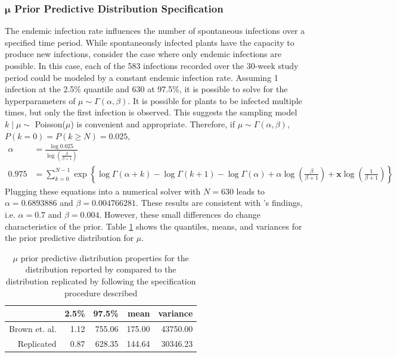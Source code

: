 \documentclass{uwstat572}
\begin{document}
\subsubsection{$\boldsymbol{\mu}$ Prior Predictive Distribution Specification}
The endemic infection rate influences the number of spontaneous infections over a specified time period. 
While spontaneously infected plants have the capacity to produce new infections, consider the case where only endemic infections are possible.
In this case, each of the 583 infections recorded over the 30-week study period could be modeled by a constant endemic infection rate. 
Assuming 1 infection at the 2.5\% quantile and 630 at 97.5\%, it is possible to solve for the hyperparameters of $\mu \sim \Gamma(\alpha, \beta)$. 
It is possible for plants to be infected multiple times, but only the first infection is observed. 
This suggests the sampling model $k \mid \mu \sim$ Poisson($\mu$) is convenient and appropriate. 
Therefore, if $\mu \sim \Gamma(\alpha, \beta)$, $P(k=0)=P(k \ge N)=0.025$,
\begin{align*}
\alpha &= \frac{\log 0.025}{\log \left( \frac{\beta}{\beta+1} \right)} \\
0.975 &= \sum_{k=0}^{N-1} \exp \left\{ \log \Gamma(\alpha+k) - \log \Gamma(k+1) - \log \Gamma(\alpha) + \alpha \log \left(\frac{\beta}{\beta +1} \right) + \boldsymbol{x} \log \left(\frac{1}{\beta +1} \right) \right\}
\end{align*}
Plugging these equations into a numerical solver with $N=630$ leads to $\alpha=0.6893886$ and $\beta=0.004766281$. 
These results are consistent with \citet{Brown}'s findings, i.e. $\alpha=0.7$ and $\beta=0.004$. 
However, these small differences do change characteristics of the prior.  
Table \ref{table:mu_prior_quantile} shows the quantiles, means, and variances for the prior predictive distribution for $\mu$. 

\begin{table}[ht]
\centering
\begin{tabular}{rrrrr}
  \hline
 & 2.5\% & 97.5\% & mean & variance \\ 
  \hline
Brown et. al. & 1.12 & 755.06 & 175.00 & 43750.00 \\ 
  Replicated & 0.87 & 628.35 & 144.64 & 30346.23 \\ 
   \hline
\end{tabular}
\caption{$\mu$ prior predictive distribution properties for the distribution reported by \cite{Brown} compared to the distribution replicated by following the specification procedure described}
\label{table:mu_prior_quantile}
\end{table}
\end{document}
